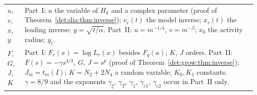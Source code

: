 \documentclass[11pt,letterpaper]{article}
\numberwithin{equation}{section}
\theoremstyle{definition}\newtheorem{definition}[theorem]{Definition}
\theoremstyle{remark}\newtheorem{remark}[theorem]{Remark}
\begin{document}
\begin{longtable}{@{}>{\raggedright\arraybackslash}p{} >{\raggedright\arraybackslash}p{}@{}}
$u$, $v$, $x$, $y$ & Part~I: $u$ the variable of $H_k$ and a complex parameter (proof of Theorem~\ref{det:dia:thm:inverse}); $v_r(t)$ the model inverse; $x_r(t)$ the leading inverse; $y=\sqrt{t/\alpha}$. Part~II: $u=m^{-1/4}$, $v=m^{-\beta}$; $x_0$ the activity radius; $y_\ell$.\\
$F$, $G$, $J$, $K$ & Part~I: $F_r(x)=\log L_r(x)$ besides $F_q(a)$; $K$, $J$ orders. Part~II: $F(s)=-\gamma s^{4/3}$, $G$, $J=s^p$ (proof of Theorem~\ref{det:grow:thm:inverse}); $J_m=t_m(I)$; $K=N_2+2N_4$ a random variable; $K_0,K_1$ constants. $\gamma=8/9$ and the exponents $\gamma_\xi$, $\gamma_T$, $\gamma_1$, $\gamma_{c1}$, $\gamma_{c2}$ occur in Part~II only.\\
\bottomrule
\end{longtable}
\addtocounter{table}{-1}%
\endgroup
\end{document}
